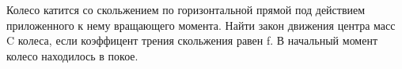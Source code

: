 Колесо катится со скольжением по горизонтальной прямой под действием приложенного к нему вращающего момента. Найти закон движения центра масс C колеса, если коэффицент трения 
скольжения равен f. В начальный момент колесо находилось в покое.